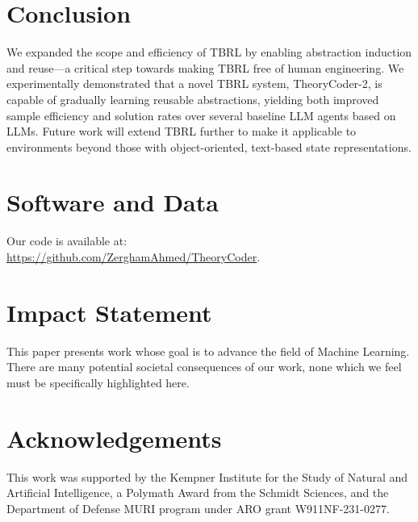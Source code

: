\documentclass{article}
\theoremstyle{plain}
\theoremstyle{definition}
\theoremstyle{remark}
\begin{document}
\section{Conclusion}
\label{conclusion}
We expanded the scope and efficiency of TBRL by enabling abstraction induction and reuse---a critical step towards making TBRL free of human engineering.
We experimentally demonstrated that a novel TBRL system, TheoryCoder-2, is capable of gradually learning reusable abstractions, yielding both improved sample efficiency and solution rates over several baseline LLM agents based on LLMs.
Future work will extend TBRL further to make it applicable to environments beyond those with object-oriented, text-based state representations.

\section*{Software and Data}

Our code is available at:\\
\url{https://github.com/ZerghamAhmed/TheoryCoder}.

\section*{Impact Statement}

This paper presents work whose goal is to advance the field of Machine
Learning. There are many potential societal consequences of our work, none
which we feel must be specifically highlighted here.

\section*{Acknowledgements}

This work was supported by the Kempner Institute for the Study of Natural and Artificial Intelligence, a Polymath Award from the Schmidt Sciences, and the Department of Defense MURI program under ARO grant W911NF-231-0277.






\newpage
\appendix
\onecolumn
\end{document}
